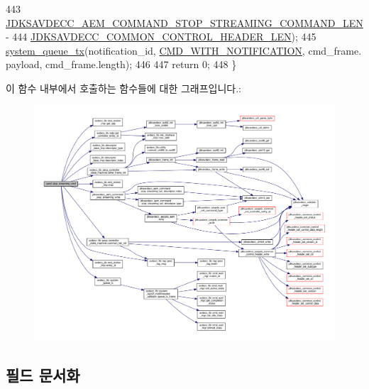 \begin{DoxyCode}
443                                                        
      \hyperlink{group__command__stop__streaming_ga37e2bec2217af78aed138bbf254234d0}{JDKSAVDECC\_AEM\_COMMAND\_STOP\_STREAMING\_COMMAND\_LEN} -
444                                                            
      \hyperlink{group__jdksavdecc__avtp__common__control__header_gaae84052886fb1bb42f3bc5f85b741dff}{JDKSAVDECC\_COMMON\_CONTROL\_HEADER\_LEN});
445     \hyperlink{namespaceavdecc__lib_a6dd511685627c0865a3442b539a4e8e9}{system\_queue\_tx}(notification\_id, \hyperlink{namespaceavdecc__lib_aabcadff06aa62be0ce47bc0646823604aba48b8a017e06fb240b650cdea965178}{CMD\_WITH\_NOTIFICATION}, cmd\_frame.
      payload, cmd\_frame.length);
446 
447     \textcolor{keywordflow}{return} 0;
448 \}
\end{DoxyCode}


이 함수 내부에서 호출하는 함수들에 대한 그래프입니다.\+:
\nopagebreak
\begin{figure}[H]
\begin{center}
\leavevmode
\includegraphics[width=350pt]{classavdecc__lib_1_1stream__input__descriptor__imp_a528a63dd6b8e71eb0cffcf5cb20936a2_cgraph}
\end{center}
\end{figure}




\subsection{필드 문서화}
